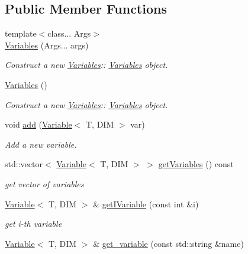 \subsection*{Public Member Functions}
\begin{DoxyCompactItemize}
\item 
{\footnotesize template$<$class... Args$>$ }\\\hyperlink{classVariables_a125cbddbe8bdfbb40e7b16ae6498b24c}{Variables} (Args... args)
\begin{DoxyCompactList}\small\item\em Construct a new \hyperlink{classVariables}{Variables}\+:\+: \hyperlink{classVariables}{Variables} object. \end{DoxyCompactList}\item 
\mbox{\label{classVariables_afe53197ea1895f91ab7b68f8534ee3e0}} 
\hyperlink{classVariables_afe53197ea1895f91ab7b68f8534ee3e0}{Variables} ()
\begin{DoxyCompactList}\small\item\em Construct a new \hyperlink{classVariables}{Variables}\+:\+: \hyperlink{classVariables}{Variables} object. \end{DoxyCompactList}\item 
void \hyperlink{classVariables_a27e62c655731650bb57e70fc656a5040}{add} (\hyperlink{classVariable}{Variable}$<$ T, D\+IM $>$ var)
\begin{DoxyCompactList}\small\item\em Add a new variable. \end{DoxyCompactList}\item 
std\+::vector$<$ \hyperlink{classVariable}{Variable}$<$ T, D\+IM $>$ $>$ \hyperlink{classVariables_a62a9cd30a9cfce3896ede05747e14871}{get\+Variables} () const
\begin{DoxyCompactList}\small\item\em get vector of variables \end{DoxyCompactList}\item 
\hyperlink{classVariable}{Variable}$<$ T, D\+IM $>$ \& \hyperlink{classVariables_a0fb59f4145974f7d284a5b6f906285a9}{get\+I\+Variable} (const int \&i)
\begin{DoxyCompactList}\small\item\em get i-\/th variable \end{DoxyCompactList}\item 
\hyperlink{classVariable}{Variable}$<$ T, D\+IM $>$ \& \hyperlink{classVariables_a4ebd51b179445ea0d6b6276b9e90cfa6}{get\+\_\+variable} (const std\+::string \&name)

\end{DoxyCompactItemize}
